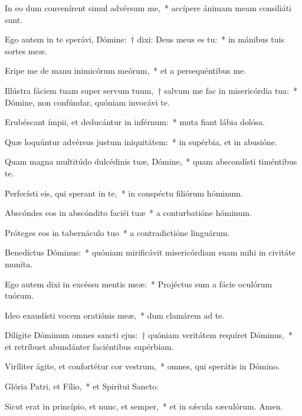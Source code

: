 \item In eo dum convenírent simul advérsum me,~* accípere ánimam meam consiliáti sunt.

\item Ego autem in te sperávi, Dómine:~† dixi: Deus meus es tu:~* in mánibus tuis sortes meæ.

\item Eripe me de manu inimicórum meórum,~* et a persequéntibus me.

\item Illústra fáciem tuam super servum tuum,~† salvum me fac in misericórdia tua:~* Dómine, non confúndar, quóniam invocávi te.

\item Erubéscant ímpii, et deducántur in inférnum:~* muta fiant lábia dolósa.

\item Quæ loquúntur advérsus justum iniquitátem:~* in supérbia, et in abusióne.

\item Quam magna multitúdo dulcédinis tuæ, Dómine,~* quam abscondísti timéntibus te.

\item Perfecísti eis, qui sperant in te,~* in conspéctu filiórum hóminum.

\item Abscóndes eos in abscóndito faciéi tuæ~* a conturbatióne hóminum.

\item Próteges eos in tabernáculo tuo~* a contradictióne linguárum.

\item Benedíctus Dóminus:~* quóniam mirificávit misericórdiam suam mihi in civitáte muníta.

\item Ego autem dixi in excéssu mentis meæ:~* Projéctus sum a fácie oculórum tuórum.

\item Ideo exaudísti vocem oratiónis meæ,~* dum clamárem ad te.

\item Dilígite Dóminum omnes sancti ejus:~† quóniam veritátem requíret Dóminus,~* et retríbuet abundánter faciéntibus supérbiam.

\item Viríliter ágite, et confortétur cor vestrum,~* omnes, qui sperátis in Dómino.

\item Glória Patri, et Fílio,~* et Spirítui Sancto.

\item Sicut erat in princípio, et nunc, et semper,~* et in sǽcula sæculórum. Amen.

